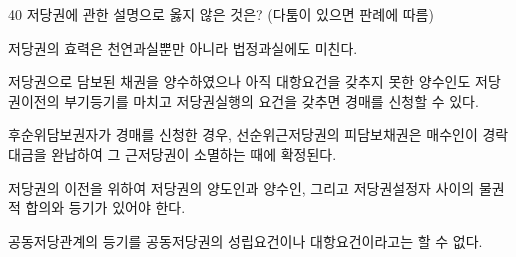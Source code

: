 \begin{question}{40}
저당권에 관한 설명으로 옳지 않은 것은? (다툼이 있으면 판례에 따름)
\begin{choices}
  \item 저당권의 효력은 천연과실뿐만 아니라 법정과실에도 미친다.
  \item 저당권으로 담보된 채권을 양수하였으나 아직 대항요건을 갖추지 못한 양수인도 저당권이전의 부기등기를 마치고 저당권실행의 요건을 갖추면 경매를 신청할 수 있다.
  \item 후순위담보권자가 경매를 신청한 경우, 선순위근저당권의 피담보채권은 매수인이 경락대금을 완납하여 그 근저당권이 소멸하는 때에 확정된다.
  \item 저당권의 이전을 위하여 저당권의 양도인과 양수인, 그리고 저당권설정자 사이의 물권적 합의와 등기가 있어야 한다.
  \item 공동저당관계의 등기를 공동저당권의 성립요건이나 대항요건이라고는 할 수 없다.
\end{choices}
\end{question}
